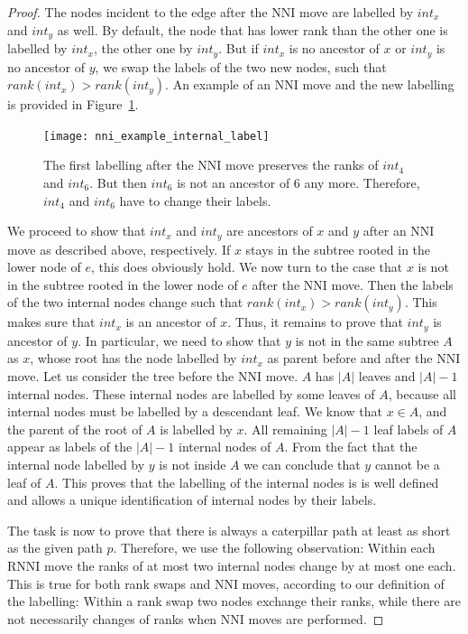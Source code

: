 \documentclass[11pt, a4paper]{article}
\newcommand{\nni}{\mathrm{NNI}}
\newcommand{\rnni}{\mathrm{RNNI}}
\begin{document}
\begin{proof}
	The nodes incident to the edge after the $\nni$ move are labelled by $int_x$ and $int_y$ as well.
	By default, the node that has lower rank than the other one is labelled by $int_x$, the other one by $int_y$.
	But if $int_x$ is no ancestor of $x$ or $int_y$ is no ancestor of $y$, we swap the labels of the two new nodes, such that $rank(int_x) > rank(int_y)$.
	An example of an $\nni$ move and the new labelling is provided in Figure~\ref{fig:nni_example_internal_label}.

	\begin{figure}[H]
		\centering
		\texttt{[image: nni\_example\_internal\_label]}
		\caption{The first labelling after the $\nni$ move preserves the ranks of $int_4$ and $int_6$.
		But then $int_6$ is not an ancestor of $6$ any more.
		Therefore, $int_4$ and $int_6$ have to change their labels.
		}
		\label{fig:nni_example_internal_label}
	\end{figure}

	We proceed to show that $int_x$ and $int_y$ are ancestors of $x$ and $y$ after an $\nni$ move as described above, respectively.
	If $x$ stays in the subtree rooted in the lower node of $e$, this does obviously hold.
	We now turn to the case that $x$ is not in the subtree rooted in the lower node of $e$ after the $\nni$ move.
	Then the labels of the two internal nodes change such that $rank(int_x) > rank(int_y)$.
	This makes sure that $int_x$ is an ancestor of $x$.
	Thus, it remains to prove that $int_y$ is ancestor of $y$.
	In particular, we need to show that $y$ is not in the same subtree $A$ as $x$, whose root has the node labelled by $int_x$ as parent before and after the $\nni$ move.
	Let us consider the tree before the $\nni$ move.
	$A$ has $|A|$ leaves and $|A| - 1$ internal nodes.
	These internal nodes are labelled by some leaves of $A$, because all internal nodes must be labelled by a descendant leaf.
	We know that $x \in A$, and the parent of the root of $A$ is labelled by $x$.
	All remaining $|A|-1$ leaf labels of $A$ appear as labels of the $|A|-1$ internal nodes of $A$.
	From the fact that the internal node labelled by $y$ is not inside $A$ we can conclude that $y$ cannot be a leaf of $A$.
	This proves that the labelling of the internal nodes is is well defined and allows a unique identification of internal nodes by their labels.

	The task is now to prove that there is always a caterpillar path at least as short as the given path $p$.
	Therefore, we use the following observation:
	Within each $\rnni$ move the ranks of at most two internal nodes change by at most one each.
	This is true for both rank swaps and $\nni$ moves, according to our definition of the labelling:
	Within a rank swap two nodes exchange their ranks, while there are not necessarily changes of ranks when $\nni$ moves are performed.


\end{proof}
\end{document}

